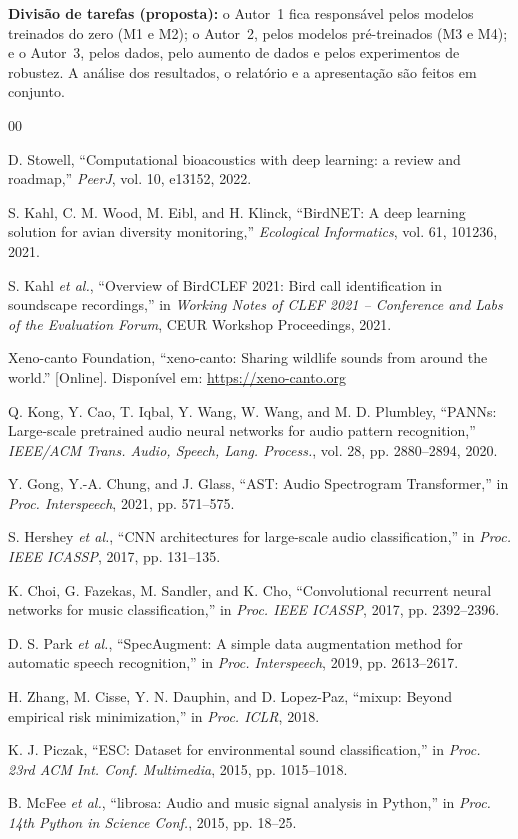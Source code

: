 \documentclass[conference]{IEEEtran}
\begin{document}
\textbf{Divisão de tarefas (proposta):} o Autor~1 fica responsável pelos modelos treinados do zero (M1 e M2); o Autor~2, pelos modelos pré-treinados (M3 e M4); e o Autor~3, pelos dados, pelo aumento de dados e pelos experimentos de robustez. A análise dos resultados, o relatório e a apresentação são feitos em conjunto.

\begin{thebibliography}{00}

 D. Stowell, ``Computational bioacoustics with deep learning: a review and roadmap,'' \textit{PeerJ}, vol. 10, e13152, 2022.

 S. Kahl, C. M. Wood, M. Eibl, and H. Klinck, ``BirdNET: A deep learning solution for avian diversity monitoring,'' \textit{Ecological Informatics}, vol. 61, 101236, 2021.

 S. Kahl \textit{et al.}, ``Overview of BirdCLEF 2021: Bird call identification in soundscape recordings,'' in \textit{Working Notes of CLEF 2021 -- Conference and Labs of the Evaluation Forum}, CEUR Workshop Proceedings, 2021.

 Xeno-canto Foundation, ``xeno-canto: Sharing wildlife sounds from around the world.'' [Online]. Disponível em: \url{https://xeno-canto.org}

 Q. Kong, Y. Cao, T. Iqbal, Y. Wang, W. Wang, and M. D. Plumbley, ``PANNs: Large-scale pretrained audio neural networks for audio pattern recognition,'' \textit{IEEE/ACM Trans. Audio, Speech, Lang. Process.}, vol. 28, pp. 2880--2894, 2020.

 Y. Gong, Y.-A. Chung, and J. Glass, ``AST: Audio Spectrogram Transformer,'' in \textit{Proc. Interspeech}, 2021, pp. 571--575.

 S. Hershey \textit{et al.}, ``CNN architectures for large-scale audio classification,'' in \textit{Proc. IEEE ICASSP}, 2017, pp. 131--135.

 K. Choi, G. Fazekas, M. Sandler, and K. Cho, ``Convolutional recurrent neural networks for music classification,'' in \textit{Proc. IEEE ICASSP}, 2017, pp. 2392--2396.

 D. S. Park \textit{et al.}, ``SpecAugment: A simple data augmentation method for automatic speech recognition,'' in \textit{Proc. Interspeech}, 2019, pp. 2613--2617.

 H. Zhang, M. Cisse, Y. N. Dauphin, and D. Lopez-Paz, ``mixup: Beyond empirical risk minimization,'' in \textit{Proc. ICLR}, 2018.

 K. J. Piczak, ``ESC: Dataset for environmental sound classification,'' in \textit{Proc. 23rd ACM Int. Conf. Multimedia}, 2015, pp. 1015--1018.

 B. McFee \textit{et al.}, ``librosa: Audio and music signal analysis in Python,'' in \textit{Proc. 14th Python in Science Conf.}, 2015, pp. 18--25.

\end{thebibliography}
\end{document}
